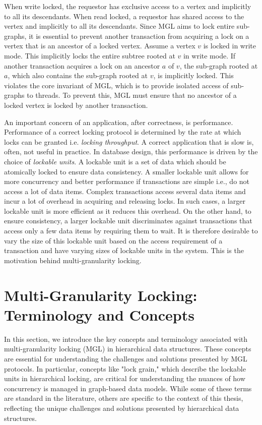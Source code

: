 When write locked, the requestor has exclusive access to a vertex and implicitly to all its descendants. When read locked, a requestor has shared access to the vertex and implicitly to all its descendants. Since MGL aims to lock entire sub-graphs, it is essential to prevent another transaction from acquiring a lock on a vertex that is an ancestor of a locked vertex. Assume a vertex $v$ is locked in write mode. This implicitly locks the entire subtree rooted at $v$ in write mode. If another transaction acquires a lock on an ancestor $a$ of $v$, the sub-graph rooted at $a$, which also contains the sub-graph rooted at $v$, is implicitly locked. This violates the core invariant of MGL, which is to provide isolated access of sub-graphs to threads. To prevent this, MGL must ensure that no ancestor of a locked vertex is locked by another transaction. 

An important concern of an application, after correctness, is performance. Performance of a correct locking protocol is determined by the rate at which locks can be granted i.e. \emph{locking throughput}. A correct application that is slow is, often, not useful in practice. In database design, this performance is driven by the choice of \emph{lockable units}. A lockable unit is a set of data which should be atomically locked to ensure data consistency. A smaller lockable unit allows for more concurrency and better performance if transactions are simple i.e., do not access a lot of data items. Complex transactions access several data items and incur a lot of overhead in acquiring and releasing locks. In such cases, a larger lockable unit is more efficient as it reduces this overhead.  On the other hand, to ensure consistency, a larger lockable unit discriminates against transactions that access only a few data items by requiring them to wait. It is therefore desirable to vary the size of this lockable unit based on the access requirement of a transaction and have varying sizes of lockable units in the system. This is the motivation behind multi-granularity locking. 

\section{Multi-Granularity Locking: Terminology and Concepts}
In this section, we introduce the key concepts and terminology associated with multi-granularity locking (MGL) in hierarchical data structures. These concepts are essential for understanding the challenges and solutions presented by MGL protocols.
In particular, concepts like "lock grain," which describe the lockable units in hierarchical locking, are critical for understanding the nuances of how concurrency is managed in graph-based data models. While some of these terms are standard in the literature, others are specific to the context of this thesis, reflecting the unique challenges and solutions presented by hierarchical data structures.


